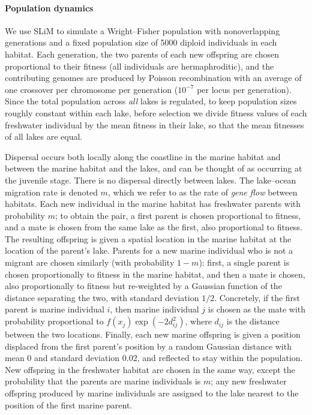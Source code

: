\documentclass{article}
\begin{document}
\paragraph{Population dynamics}
We use SLiM to simulate a Wright--Fisher population with nonoverlapping generations 
and a fixed population size of 5000 diploid individuals in each habitat.
Each generation, the two parents of each new offspring are chosen proportional to their fitness 
(all individuals are hermaphroditic),
and the contributing genomes are produced by Poisson recombination 
with an average of one crossover per chromosome per generation 
($10^{-7}$ per locus per generation). 
Since the total population across \emph{all} lakes is regulated,
to keep population sizes roughly constant within each lake, 
before selection we divide fitness values of each freshwater individual 
by the mean fitness in their lake,
so that the mean fitnesses of all lakes are equal.

Dispersal occurs both locally along the coastline in the marine habitat 
and between the marine habitat and the lakes, and can be thought of as occurring at the juvenile stage. 
There is no dispersal directly between lakes.
The lake--ocean migration rate is denoted $m$, 
which we refer to as the rate of \emph{gene flow} between habitats.
Each new individual in the marine habitat has freshwater parents with probability $m$; 
to obtain the pair, a first parent is chosen proportional to fitness, and a mate is chosen from the same lake as the first, also proportional to fitness. 
The resulting offspring is given a spatial location in the marine habitat at the location of the parent's lake. 
Parents for a new marine individual who is not a migrant are chosen similarly (with probability $1-m$): 
first, a single parent is chosen proportionally to fitness in the marine habitat,
and then a mate is chosen, also proportionally to fitness but re-weighted by a Gaussian function of the distance separating the two, with standard deviation $1/2$. 
Concretely, if the first parent is marine individual $i$, then marine individual $j$ is chosen as the mate with probability proportional to $f(x_j) \exp(-2d_{ij}^2)$,
where $d_{ij}$ is the distance between the two locations. 
Finally, each new marine offspring is given a position displaced from the first parent's position by a random Gaussian distance with mean 0 and standard deviation 0.02, 
and reflected to stay within the population.
New offspring in the freshwater habitat are chosen in the same way, except the probability that the parents are marine individuals is $m$; 
any new freshwater offspring produced by marine individuals are assigned to the lake nearest to the position of the first marine parent.
\end{document}
